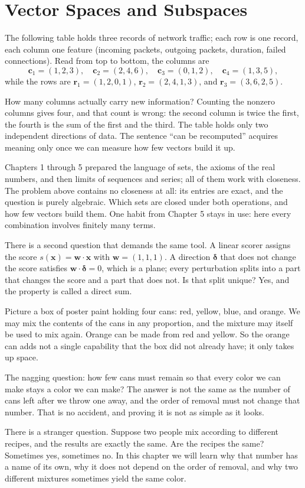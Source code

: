 \chapter{Vector Spaces and Subspaces}

The following table holds three records of network traffic; each row is one record, each column
one feature (incoming packets, outgoing packets, duration, failed connections). Read from top to
bottom, the columns are
\[
  \mathbf{c}_{1}=(1,2,3),\quad \mathbf{c}_{2}=(2,4,6),\quad
  \mathbf{c}_{3}=(0,1,2),\quad \mathbf{c}_{4}=(1,3,5),
\]
while the rows are $\mathbf{r}_{1}=(1,2,0,1)$, $\mathbf{r}_{2}=(2,4,1,3)$, and
$\mathbf{r}_{3}=(3,6,2,5)$.

How many columns actually carry new information? Counting the nonzero columns gives four, and
that count is wrong: the second column is twice the first, the fourth is the sum of the first
and the third. The table holds only two independent directions of data. The sentence ``can be
recomputed'' acquires meaning only once we can measure how few vectors build it up.

Chapters 1 through 5 prepared the language of sets, the axioms of the real numbers, and then
limits of sequences and series; all of them work with closeness. The problem above contains no
closeness at all: its entries are exact, and the question is purely algebraic. Which sets are
closed under both operations, and how few vectors build them. One habit from Chapter 5 stays in
use: here every combination involves finitely many terms.

There is a second question that demands the same tool. A linear scorer assigns the score
$s(\mathbf{x})=\mathbf{w}\cdot\mathbf{x}$ with $\mathbf{w}=(1,1,1)$. A direction
$\boldsymbol{\delta}$ that does not change the score satisfies
$\mathbf{w}\cdot\boldsymbol{\delta}=0$, which is a plane; every perturbation splits into a part
that changes the score and a part that does not. Is that split unique? Yes, and the property is
called a direct sum.

\begin{untukanak}
Picture a box of poster paint holding four cans: red, yellow, blue, and orange. We may mix the
contents of the cans in any proportion, and the mixture may itself be used to mix again. Orange
can be made from red and yellow. So the orange can adds not a single capability that the box did
not already have; it only takes up space.

The nagging question: how few cans must remain so that every color we can make stays a color we
can make? The answer is not the same as the number of cans left after we throw one away, and the
order of removal must not change that number. That is no accident, and proving it is not as
simple as it looks.

There is a stranger question. Suppose two people mix according to different recipes, and the
results are exactly the same. Are the recipes the same? Sometimes yes, sometimes no. In this
chapter we will learn why that number has a name of its own, why it does not depend on the order
of removal, and why two different mixtures sometimes yield the same color.
\end{untukanak}

